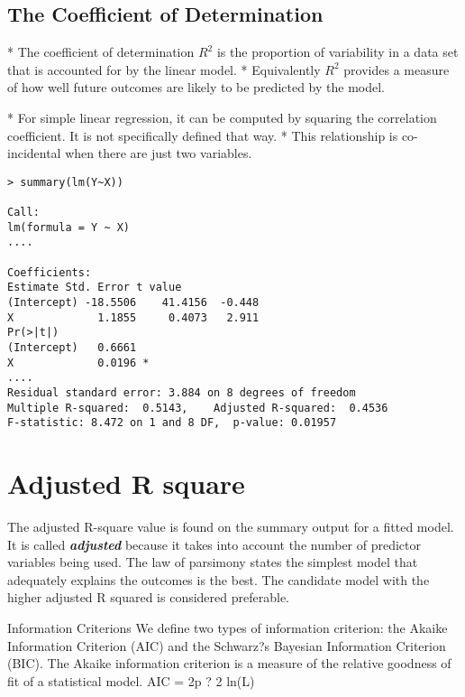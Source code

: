 \subsection*{The Coefficient of Determination}

* The coefficient of determination $R^2$ is the proportion of variability in a data set that is accounted for by the linear model. 
* Equivalently $R^2$ provides a measure of how well future outcomes are likely to be predicted by the model.

* For simple linear regression, it can be computed by squaring the correlation coefficient. It is not specifically defined that way. 
* This relationship is co-incidental when there are just two variables.






{

\begin{framed}
\begin{verbatim}
> summary(lm(Y~X))

Call:
lm(formula = Y ~ X)
....

Coefficients:
Estimate Std. Error t value
(Intercept) -18.5506    41.4156  -0.448
X             1.1855     0.4073   2.911
Pr(>|t|)  
(Intercept)   0.6661  
X             0.0196 *
....
Residual standard error: 3.884 on 8 degrees of freedom
Multiple R-squared:  0.5143,    Adjusted R-squared:  0.4536 
F-statistic: 8.472 on 1 and 8 DF,  p-value: 0.01957

\end{verbatim}
\end{framed}
}



\section{Adjusted R square}

\noindent The adjusted R-square value is found on the summary output for a fitted model. 
It is called \textbf{\emph{adjusted}} because it takes into account the number of predictor variables being used. 
The law of parsimony states the simplest model that adequately explains the outcomes is the best. 
The candidate model with the higher adjusted R squared is considered preferable.

Information Criterions
We define two types of information criterion: the Akaike Information Criterion (AIC) and the
Schwarz?s Bayesian Information Criterion (BIC). The Akaike information criterion is a measure
of the relative goodness of fit of a statistical model.
AIC = 2p ? 2 ln(L)


